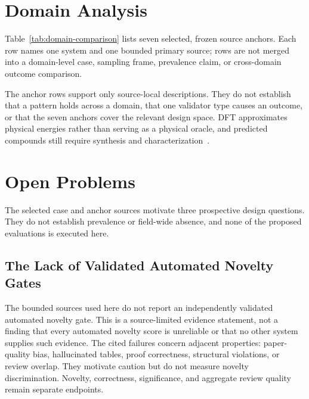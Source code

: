 \documentclass{article}
\begin{document}
\section{Domain Analysis}
\label{sec:domains}

Table~\ref{tab:domain-comparison} lists seven selected, frozen source anchors. Each row names one system and one bounded primary source; rows are not merged into a domain-level case, sampling frame, prevalence claim, or cross-domain outcome comparison.

\begin{table}[t]
\centering
\scriptsize

\caption{Seven selected, frozen source anchors. The rows demonstrate how the vocabulary can be instantiated at named boundaries; they are not representative domain samples or a common outcome scale.}
\label{tab:domain-comparison}
\end{table}

\noindent The anchor rows support only source-local descriptions. They do not establish that a pattern holds across a domain, that one validator type causes an outcome, or that the seven anchors cover the relevant design space. DFT approximates physical energies rather than serving as a physical oracle, and predicted compounds still require synthesis and characterization~\citep{cheetham2024gnome}.


\section{Open Problems}
\label{sec:openproblems}

The selected case and anchor sources motivate three prospective design questions. They do not establish prevalence or field-wide absence, and none of the proposed evaluations is executed here.

\subsection{The Lack of Validated Automated Novelty Gates}
\label{sec:op1}

The bounded sources used here do not report an independently validated automated novelty gate. This is a source-limited evidence statement, not a finding that every automated novelty score is unreliable or that no other system supplies such evidence. The cited failures concern adjacent properties: paper-quality bias, hallucinated tables, proof correctness, structural violations, or review overlap. They motivate caution but do not measure novelty discrimination. Novelty, correctness, significance, and aggregate review quality remain separate endpoints.
\end{document}
